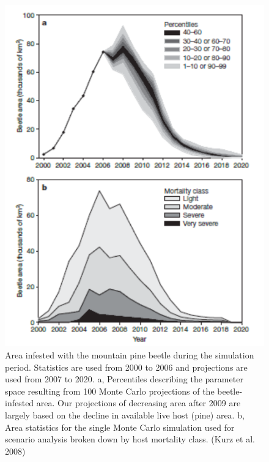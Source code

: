 \documentclass[12pt,oneside]{book}
\begin{document}
\begin{figure}

{\centering \includegraphics[width=0.8\linewidth]{figures/chap8/f811_Kurz2} 

}

\caption{Area infested with the mountain pine beetle during the simulation period. Statistics are used from 2000 to 2006 and projections are used from 2007 to 2020. a, Percentiles describing the parameter space resulting from 100 Monte Carlo projections of the beetle-infested area. Our projections of decreasing area after 2009 are largely based on the decline in available live host (pine) area. b, Area statistics for the single Monte Carlo simulation used for scenario analysis broken down by host mortality class. (Kurz et al. 2008)}\label{fig:f811}
\end{figure}
\end{document}
